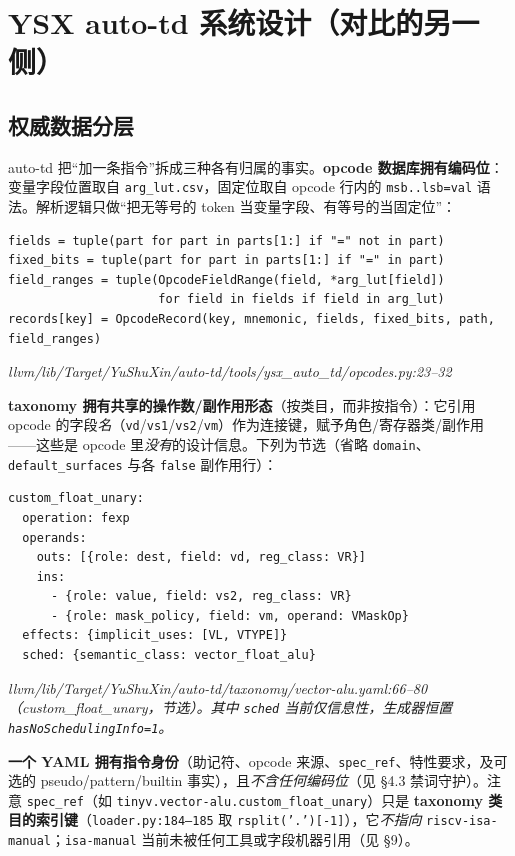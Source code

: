 \documentclass[11pt,UTF8,fontset=none]{ctexart}
\newcommand{\fcite}[1]{{\footnotesize\itshape\textcolor{framegray}{#1}}}
\begin{document}
\section{YSX auto-td 系统设计（对比的另一侧）}

\subsection{权威数据分层}
auto-td 把“加一条指令”拆成三种各有归属的事实。\textbf{opcode 数据库拥有编码位}：变量字段位置取自 \texttt{arg\_lut.csv}，固定位取自 opcode 行内的 \texttt{msb..lsb=val} 语法。解析逻辑只做“把无等号的 token 当变量字段、有等号的当固定位”：
\begin{lstlisting}
fields = tuple(part for part in parts[1:] if "=" not in part)
fixed_bits = tuple(part for part in parts[1:] if "=" in part)
field_ranges = tuple(OpcodeFieldRange(field, *arg_lut[field])
                     for field in fields if field in arg_lut)
records[key] = OpcodeRecord(key, mnemonic, fields, fixed_bits, path, field_ranges)
\end{lstlisting}
\fcite{llvm/lib/Target/YuShuXin/auto-td/tools/ysx\_auto\_td/opcodes.py:23--32}

\textbf{taxonomy 拥有共享的操作数/副作用形态}（按类目，而非按指令）：它引用 opcode 的字段\emph{名}（\texttt{vd}/\texttt{vs1}/\texttt{vs2}/\texttt{vm}）作为连接键，赋予角色/寄存器类/副作用——这些是 opcode 里\emph{没有}的设计信息。下列为节选（省略 \texttt{domain}、\texttt{default\_surfaces} 与各 \texttt{false} 副作用行）：
\begin{lstlisting}
custom_float_unary:
  operation: fexp
  operands:
    outs: [{role: dest, field: vd, reg_class: VR}]
    ins:
      - {role: value, field: vs2, reg_class: VR}
      - {role: mask_policy, field: vm, operand: VMaskOp}
  effects: {implicit_uses: [VL, VTYPE]}
  sched: {semantic_class: vector_float_alu}
\end{lstlisting}
\fcite{llvm/lib/Target/YuShuXin/auto-td/taxonomy/vector-alu.yaml:66--80（custom\_float\_unary，节选）。其中 \texttt{sched} 当前仅信息性，生成器恒置 \texttt{hasNoSchedulingInfo=1}。}

\textbf{一个 YAML 拥有指令身份}（助记符、opcode 来源、\texttt{spec\_ref}、特性要求，及可选的 pseudo/pattern/builtin 事实），且\emph{不含任何编码位}（见 §4.3 禁词守护）。注意 \texttt{spec\_ref}（如 \texttt{tinyv.vector-alu.custom\_float\_unary}）只是 \textbf{taxonomy 类目的索引键}（\texttt{loader.py:184--185} 取 \texttt{rsplit('.')[-1]}），它\emph{不指向} \texttt{riscv-isa-manual}；\texttt{isa-manual} 当前未被任何工具或字段机器引用（见 §9）。
\end{document}
